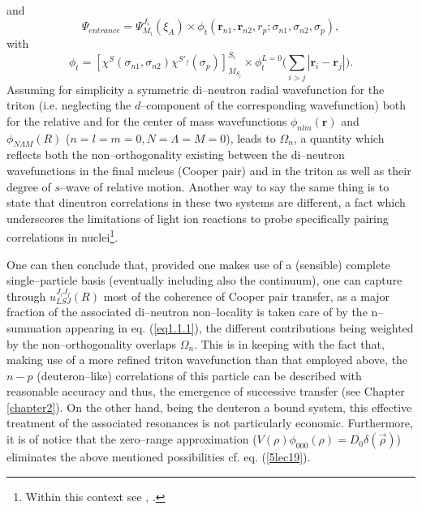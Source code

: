 and
\begin{equation}
\Psi_{entrance}=\Psi_{M_i}^{J_i}(\xi_A)\times\phi_t(\mathbf r_{n1},\mathbf r_{n2},r_p;\sigma_{n1},\sigma_{n2},\sigma_p),
\end{equation}
with
\begin{equation}\label{eq1.1.7}
\phi_t=\left[\chi^S(\sigma_{n1},\sigma_{n2})\chi^{S'_f}(\sigma_p)
\right]_{M_{S_i}}^{S_i}\times\phi_t^{L=0}\Big(\sum_{i>j}|\mathbf r_i-\mathbf r_j|\Big).
\end{equation}
Assuming for simplicity a symmetric di--neutron radial wavefunction for the triton  (i.e. neglecting the $d$--component of the corresponding wavefunction) both for the relative and for the center of mass wavefunctions $\phi_{nlm}(\mathbf{r})$ and $\phi_{N\Lambda M}(R)$ ($n=l=m=0, N=\Lambda=M=0$), leads to $\Omega_n$, a quantity which reflects both the non--orthogonality existing between the di--neutron wavefunctions in the final nucleus (Cooper pair) and in the triton as well as their degree of $s$--wave of relative motion. Another way to say the same thing is to state that dineutron correlations in these two systems are different, a fact which underscores the limitations of  light ion reactions to probe specifically pairing correlations in nuclei\footnote{Within this context see  \cite{vonOertzen:01}, \cite{Oertzen:13}.}.


One can then conclude that, provided one makes use of a (sensible) complete single--particle basis (eventually including also the continuum), one can capture through $u_{LSJ}^{J_iJ_f}(R)$ most of the coherence of Cooper pair transfer, as a major fraction of the associated di--neutron non--locality is taken care of by the n--summation appearing in eq. (\ref{eq1.1.1}), the different contributions being weighted by the non--orthogonality overlaps $\Omega_n$. This is in keeping with the fact that, making use of a more refined triton wavefunction than that employed above, the $n-p$ (deuteron--like) correlations of this particle can be described with reasonable accuracy and thus, the emergence of successive transfer (see Chapter \ref{chapter2}). On the other hand, being the deuteron a bound system, this effective treatment of the associated resonances is not particularly economic. Furthermore, it is of notice that the zero--range approximation ($V(\rho)\phi_{000}(\rho)=D_0\delta(\vec \rho)$) eliminates the above mentioned possibilities cf. eq. (\ref{5lec19}).

